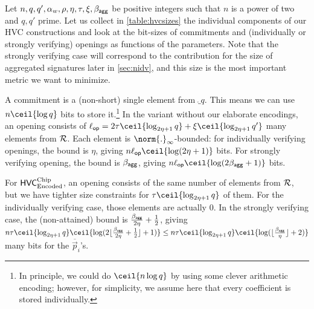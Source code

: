 \begin{remark}
Let $n, q, q',\alpha_w,\rho, \eta, \tau, \xi, \beta_{\mathsf{agg}}$ be positive integers such that $n$ is a power of two and $q,q'$ prime.
Let us collect in \autoref{table:hvcsizes} the individual components of our HVC constructions and look at the bit-sizes of commitments and (individually or strongly verifying) openings as functions of the parameters.
Note that the strongly verifying case will correspond to the contribution for the size of aggregated signatures later in \autoref{sec:nidv}, and this size is the most important metric we want to minimize.

A commitment is a (non-short) single element from $\ring_q$. This means we can use $n\ceil{\log q}$ bits to store it.\footnote{In principle, we could do $\ceil{n\log q}$ by using some clever arithmetic encoding; however, for simplicity, we assume here that every coefficient is stored individually.}
In the variant without our elaborate encodings, an opening consists of $\oplen = 2\tau\ceil{\log_{2\eta+1}q} + \xi\ceil{\log_{2\eta+1}q'}$ many elements from $\mathcal{R}$.
Each element is $\norm{.}_\infty$-bounded: for individually verifying openings, the bound is $\eta$, giving $n\oplen\ceil{\log (2\eta+1)}$ bits. For strongly verifying opening, the bound is $\beta_{\mathsf{agg}}$, giving $n\oplen\ceil{\log (2\bagg+1)}$ bits.

For $\mathsf{HVC}_{\textup{Encoded}}^{\textup{Chip}}$, an opening consists of the same number of elements from $\mathcal{R}$, but we have tighter size constraints for $\tau\ceil{\log_{2\eta+1}q}$ of them. For the individually verifying case, those elements are actually 0. In the strongly verifying case, the (non-attained) bound is $\tfrac{\beta_{\mathsf{agg}}}{2\eta}+\frac12$, giving $n\tau\ceil{\log_{2\eta+1}q}\ceil{\log(2\lfloor\frac{\bagg}{2\eta}+\frac12\rfloor +1 )} \leq n\tau\ceil{\log_{2\eta+1}q}\ceil{\log (\lfloor\tfrac{\bagg}{\eta}\rfloor+2)}$ many bits for the $\overline{\vec{p}}_i$'s.


\end{remark}
